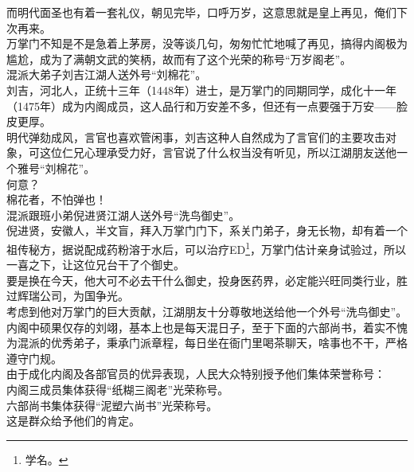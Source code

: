 \begin{multicols}{\theparacolNo}
而明代面圣也有着一套礼仪，朝见完毕，口呼万岁，这意思就是皇上再见，俺们下次再来。\\

万掌门不知是不是急着上茅房，没等谈几句，匆匆忙忙地喊了再见，搞得内阁极为尴尬，成为了满朝文武的笑柄，故而有了这个光荣的称号“万岁阁老”。\\

混派大弟子刘吉江湖人送外号“刘棉花”。\\

刘吉，河北人，正统十三年（1448年）进士，是万掌门的同期同学，成化十一年（1475年）成为内阁成员，这人品行和万安差不多，但还有一点要强于万安——脸皮更厚。\\

明代弹劾成风，言官也喜欢管闲事，刘吉这种人自然成为了言官们的主要攻击对象，可这位仁兄心理承受力好，言官说了什么权当没有听见，所以江湖朋友送他一个雅号“刘棉花”。\\

何意？\\

棉花者，不怕弹也！\\

混派跟班小弟倪进贤江湖人送外号“洗鸟御史”。\\

倪进贤，安徽人，半文盲，拜入万掌门门下，系关门弟子，身无长物，却有着一个祖传秘方，据说配成药粉溶于水后，可以治疗ED\footnote{学名。}，万掌门估计亲身试验过，所以一喜之下，让这位兄台干了个御史。\\

要是换在今天，他大可不必去干什么御史，投身医药界，必定能兴旺同类行业，胜过辉瑞公司，为国争光。\\

考虑到他对万掌门的巨大贡献，江湖朋友十分尊敬地送给他一个外号“洗鸟御史”。\\

内阁中硕果仅存的刘翊，基本上也是每天混日子，至于下面的六部尚书，着实不愧为混派的优秀弟子，秉承门派章程，每日坐在衙门里喝茶聊天，啥事也不干，严格遵守门规。\\

由于成化内阁及各部官员的优异表现，人民大众特别授予他们集体荣誉称号：\\

内阁三成员集体获得“纸糊三阁老”光荣称号。\\

六部尚书集体获得“泥塑六尚书”光荣称号。\\

这是群众给予他们的肯定。\\


\end{multicols}
